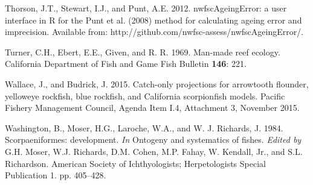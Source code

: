 \documentclass[12pt,]{article}
\begin{document}
\hypertarget{ref-Thorson2012}{}
Thorson, J.T., Stewart, I.J., and Punt, A.E. 2012. nwfscAgeingError: a
user interface in R for the Punt et al. (2008) method for calculating
ageing error and imprecision. Available from:
http://github.com/nwfsc-assess/nwfscAgeingError/.

\hypertarget{ref-Turner1969}{}
Turner, C.H., Ebert, E.E., Given, and R. R. 1969. Man-made reef ecology.
California Department of Fish and Game Fish Bulletin \textbf{146}: 221.

\hypertarget{ref-Wallace2015}{}
Wallace, J., and Budrick, J. 2015. Catch-only projections for arrowtooth
flounder, yelloweye rockfish, blue rockfish, and California scorpionfish
models. Pacific Fishery Management Council, Agenda Item I.4, Attachment
3, November 2015.

\hypertarget{ref-Washington1984}{}
Washington, B., Moser, H.G., Laroche, W.A., and W. J. Richards, J. 1984.
Scorpaeniformes: development. \emph{In} Ontogeny and systematics of
fishes. \emph{Edited by} G.H. Moser, W.J. Richards, D.M. Cohen, M.P.
Fahay, W. Kendall, Jr., and S.L. Richardson. American Society of
Ichthyologists; Herpetologists Special Publication 1. pp. 405--428.
\end{document}

